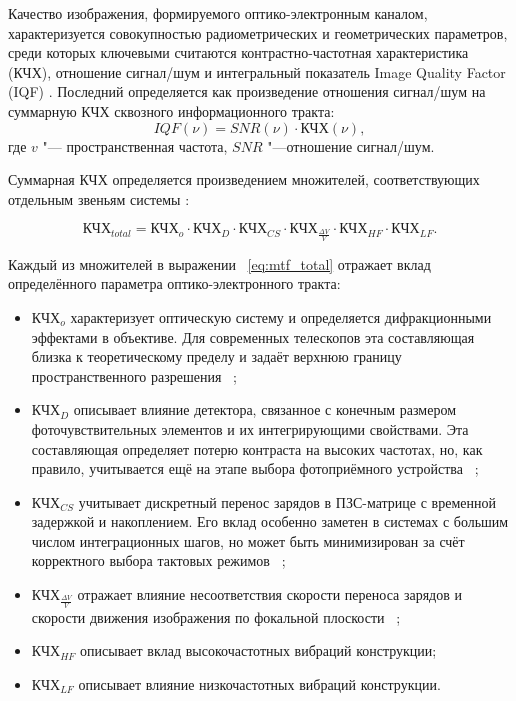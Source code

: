 Качество изображения, формируемого оптико-электронным каналом, характеризуется совокупностью радиометрических и геометрических параметров, среди которых ключевыми считаются контрастно-частотная характеристика (КЧХ), отношение сигнал/шум и интегральный показатель Image Quality Factor (IQF) \cite{leachtenauer1997general}. Последний определяется как произведение отношения сигнал/шум на суммарную КЧХ сквозного информационного тракта:
\begin{equation}
	\label{eq:eq_IQF}
	 IQF(\nu)=SNR(\nu)\cdot \text{КЧХ}(\nu),
\end{equation}
	где \( v \) "--- пространственная частота, \( SNR \) "---отношение сигнал/шум.
	
	
Суммарная КЧХ определяется произведением множителей, соответствующих отдельным звеньям системы \cite{wahballah2018smear}:

\begin{equation}
	\label{eq:mtf_total}
	\text{КЧХ}_{total}=\text{КЧХ}_o\cdot \text{КЧХ}_D \cdot \text{КЧХ}_{CS} \cdot \text{КЧХ}_{\frac{\Delta V}{V}} \cdot \text{КЧХ}_{HF} \cdot \text{КЧХ}_{LF}.
	\end{equation}

Каждый из множителей в выражении ~\eqref{eq:mtf_total} отражает вклад определённого параметра оптико-электронного тракта:

\begin{itemize}
	\item \(\text{КЧХ}_o\) характеризует оптическую систему и определяется дифракционными эффектами в объективе. Для современных телескопов эта составляющая близка к теоретическому пределу и задаёт верхнюю границу пространственного разрешения ~\cite{Abolghasemi2012};
	\item \(\text{КЧХ}_D\) описывает влияние детектора, связанное с конечным размером фоточувствительных элементов и их интегрирующими свойствами. Эта составляющая определяет потерю контраста на высоких частотах, но, как правило, учитывается ещё на этапе выбора фотоприёмного устройства ~\cite{Joseph2015};
	\item \(\text{КЧХ}_{CS}\)  учитывает дискретный перенос зарядов в ПЗС-матрице с временной задержкой и накоплением. Его вклад особенно заметен в системах с большим числом интеграционных шагов, но может быть минимизирован за счёт корректного выбора тактовых режимов ~\cite{Wong1992};
	\item \(\text{КЧХ}_{\frac{\Delta V}{V}}\) отражает влияние несоответствия скорости переноса зарядов и скорости движения изображения по фокальной плоскости ~\cite{Wong1992};
	\item \(\text{КЧХ}_{HF}\) описывает вклад высокочастотных вибраций конструкции;
	\item \(\text{КЧХ}_{LF}\) описывает влияние низкочастотных вибраций конструкции.
\end{itemize}

